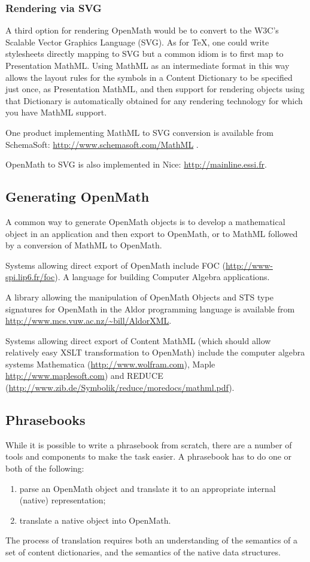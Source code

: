 \documentclass[keylogo]{openmath}
\begin{document}
\subsubsection{Rendering via SVG}

A third option for rendering OpenMath would be to convert to the W3C's
Scalable Vector Graphics Language (SVG). As for \TeX, one could write
stylesheets directly mapping to SVG but a common idiom is to first map
to Presentation MathML. Using MathML as an intermediate format in this
way allows the layout rules for the symbols in a Content Dictionary to
be specified just once, as Presentation MathML, and then support for
rendering objects using that Dictionary is automatically obtained for
any rendering technology for which you have MathML support.

One product implementing MathML to SVG conversion is available from 
SchemaSoft: \url{http://www.schemasoft.com/MathML} .

OpenMath to SVG is also implemented in Nice:
\url{http://mainline.essi.fr}.

\subsection{Generating OpenMath}
A common way to generate OpenMath objects is to develop a mathematical
object in an application and then export to OpenMath, or to MathML
followed by a conversion of MathML to OpenMath.

Systems allowing direct export of OpenMath include
FOC (\url{http://www-spi.lip6.fr/foc}). A language for
building Computer Algebra applications.

A library allowing the manipulation of OpenMath Objects and STS type
signatures for OpenMath in the Aldor
programming language is available from
\url{http://www.mcs.vuw.ac.nz/~bill/AldorXML}.


Systems allowing direct export of Content MathML (which should allow
relatively easy XSLT transformation to OpenMath) include the computer
algebra systems Mathematica
(\url{http://www.wolfram.com}), Maple \url{http://www.maplesoft.com})
and REDUCE
(\url{http://www.zib.de/Symbolik/reduce/moredocs/mathml.pdf}).

\subsection{Phrasebooks}

While it is possible to write a phrasebook from scratch, there are a
number of tools and components to make the task easier.  A phrasebook
has to do one or both of the following:
\begin{enumerate}
\item parse an OpenMath object and translate it to an appropriate
  internal (native) representation;
\item translate a native object into OpenMath.
\end{enumerate}
The process of translation requires both an understanding of the
semantics of a set of content dictionaries, and the semantics of the
native data structures.
\end{document}
